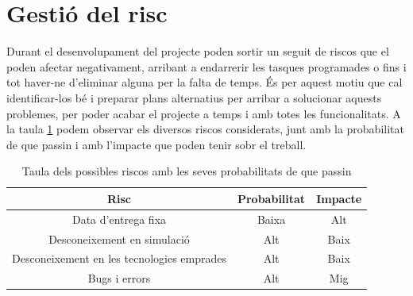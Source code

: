 \documentclass[a4paper]{article}
\begin{document}
\section{Gestió del risc}
Durant el desenvolupament del projecte poden sortir un seguit de riscos que el poden afectar negativament, arribant a endarrerir les tasques programades o fins i tot haver-ne d'eliminar alguna per la falta de temps. És per aquest motiu que cal identificar-los bé i preparar plans alternatius per arribar a solucionar aquests problemes, per poder acabar el projecte a temps i amb totes les funcionalitats. A la taula \ref{tab:taulaRiscos} podem observar els diversos riscos considerats, junt amb la probabilitat de que passin i amb l'impacte que poden tenir sobr el treball.

\begin{table}[H]
    \begin{center}
        \begin{tabular}{ | c | c | c |}
              \rowcolor{lightgray} \hline \textbf{Risc} & \textbf{Probabilitat} & \textbf{Impacte} \\ \hline
              Data d'entrega fixa & Baixa & Alt \\ \hline
              Desconeixement en simulació & Alt & Baix \\ \hline
              Desconeixement en les tecnologies emprades & Alt & Baix \\ \hline
              Bugs i errors & Alt & Mig \\ \hline
        \end{tabular}
        \caption{Taula dels possibles riscos amb les seves probabilitats de que passin}
        \label{tab:taulaRiscos}
        \end{center}
\end{table}  
\end{document}
